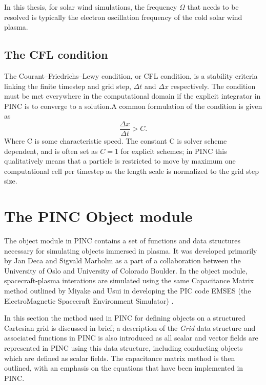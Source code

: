 In this thesis, for solar wind simulations, the frequency $\Omega$ that needs to be resolved is typically the electron oscillation frequency of the cold solar wind plasma. 


\subsection{The CFL condition}
The Courant–Friedrichs–Lewy condition, or CFL condition, is a stability criteria linking the finite timestep and grid step, $\Delta t$ and $\Delta x$ respectively. The condition must be met everywhere in the computational domain if the explicit integrator in PINC is to converge to a solution.A common formulation of the condition is given as \parencite{Marholm2019}
\begin{equation}
    \frac{\Delta x}{\Delta t} > C.
\end{equation}
Where C is some characteristic speed. The constant C is solver scheme dependent, and is often set as $C = 1$ for explicit schemes; in PINC this qualitatively means that a particle is restricted to move by maximum one computational cell per timestep as the length scale is normalized to the grid step size.

\section{The PINC Object module}
The object module in PINC contains a set of functions and data structures necessary for simulating objects immersed in plasma. It was developed primarily by Jan Deca and Sigvald Marholm as a part of a collaboration between the University of Oslo and University of Colorado Boulder. In the object module, spacecraft-plasma interations are simulated using the same Capacitance Matrix method outlined by Miyake and Usui in developing the PIC code EMSES (the ElectroMagnetic Spacecraft Environment Simulator) \parencite{Miyake2009}. 

In this section the method used in PINC for defining objects on a structured Cartesian grid is discussed in brief; a description of the \textit{Grid} data structure and associated functions in PINC is also introduced as all scalar and vector fields are represented in PINC using this data structure, including conducting objects which are defined as scalar fields. The capacitance matrix method is then outlined, with an emphasis on the equations that have been implemented in PINC. 



